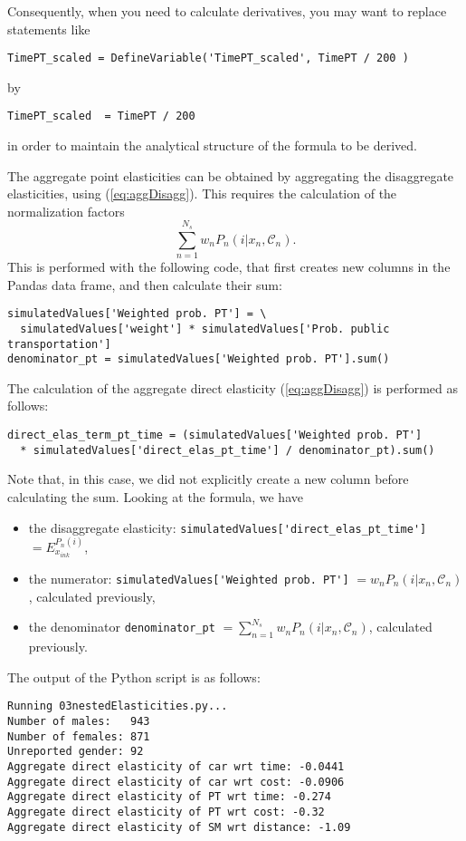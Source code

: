 \documentclass[12pt,a4paper]{article}
\newcommand{\req}[1]{(\ref{#1})}
\newcommand{\C}{\mathcal{C}}
\begin{document}
Consequently, when you need to calculate derivatives, you may want to
replace statements like
\begin{lstlisting}
TimePT_scaled = DefineVariable('TimePT_scaled', TimePT / 200 )
\end{lstlisting}
by
\begin{lstlisting}
TimePT_scaled  = TimePT / 200 
\end{lstlisting}
in order to maintain the analytical structure of the formula to be derived.

The aggregate point elasticities can be obtained by aggregating the
disaggregate elasticities, using \req{eq:aggDisagg}. This requires the
calculation of the normalization factors
\begin{equation}
\sum_{n=1}^{N_s} w_n P_n(i|x_n, \C_n).
\end{equation}
This is performed with the following code, that first creates new
columns in the Pandas data frame, and then calculate their sum:
\begin{lstlisting}
simulatedValues['Weighted prob. PT'] = \
  simulatedValues['weight'] * simulatedValues['Prob. public transportation']
denominator_pt = simulatedValues['Weighted prob. PT'].sum()
\end{lstlisting}

The calculation of the aggregate direct elasticity \req{eq:aggDisagg}
is performed as follows:
\begin{lstlisting}
direct_elas_term_pt_time = (simulatedValues['Weighted prob. PT']
  * simulatedValues['direct_elas_pt_time'] / denominator_pt).sum()
\end{lstlisting}
Note that, in this case, we did not explicitly create a new column
before calculating the sum. Looking at the formula, we have
\begin{itemize}
  \item the disaggregate elasticity: \lstinline+simulatedValues['direct_elas_pt_time']+ $=E_{x_{ink}}^{P_n(i)}$,
  \item the numerator: \lstinline+simulatedValues['Weighted prob. PT']+ $=w_n P_n(i|x_n,\C_n)$, calculated previously,
  \item the denominator \lstinline+denominator_pt+ $=
    \sum_{n=1}^{N_s} w_n P_n(i|x_n, \C_n)$, calculated previously.
\end{itemize}

The output of the Python script is as follows:
\begin{lstlisting}
Running 03nestedElasticities.py...
Number of males:   943
Number of females: 871
Unreported gender: 92
Aggregate direct elasticity of car wrt time: -0.0441
Aggregate direct elasticity of car wrt cost: -0.0906
Aggregate direct elasticity of PT wrt time: -0.274
Aggregate direct elasticity of PT wrt cost: -0.32
Aggregate direct elasticity of SM wrt distance: -1.09
\end{lstlisting}
\end{document}

